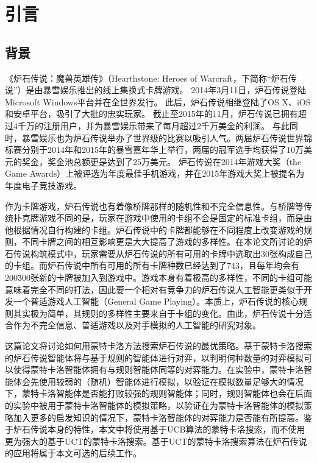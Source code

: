 \section{引言}
\label{section:Introduction}
\subsection{背景}
\label{section:Background}

《炉石传说：魔兽英雄传》（Hearthstone: Heroes of Warcraft，下简称“炉石传说”）是由暴雪娱乐推出的线上集换式卡牌游戏。
2014年3月11日，炉石传说登陆Microsoft Windows平台并在全世界发行。
此后，炉石传说相继登陆了OS X、iOS和安卓平台，吸引了大批的忠实玩家。
截止至2015年的11月，炉石传说已拥有超过4千万的注册用户，并为暴雪娱乐带来了每月超过2千万美金的利润\cite{HearthstonePlayerCount}。
与此同时，暴雪娱乐也为炉石传说举办了世界级的比赛以吸引人气。两届炉石传说世界锦标赛分别于2014年和2015年的暴雪嘉年华上举行，两届的冠军选手均获得了10万美元的奖金，奖金池总额更是达到了25万美元\cite{WorldChampionship2015}。
炉石传说在2014年游戏大奖（the Game Awards）上被评选为年度最佳手机游戏\cite{HearthstoneGameAwards2014}，并在2015年游戏大奖上被提名为年度电子竞技游戏\cite{HearthstoneGameAwards2015}。

作为卡牌游戏，炉石传说也有着像桥牌那样的随机性和不完全信息性。与桥牌等传统扑克牌游戏不同的是，玩家在游戏中使用的卡组不会是固定的标准卡组，而是由他根据情况自行构建的卡组。炉石传说中的卡牌都能够在不同程度上改变游戏的规则，不同卡牌之间的相互影响更是大大提高了游戏的多样性。在本论文所讨论的炉石传说构筑模式中，玩家需要从炉石传说的所有可用的卡牌中选取出30张构成自己的卡组。而炉石传说中所有可用的所有卡牌种数已经达到了743，且每年均会有200\~300张新的卡牌被加入到游戏中。游戏本身有着极高的多样性，不同的卡组可能意味着完全不同的打法，因此要一个相对有竞争力的炉石传说人工智能更类似于开发一个普适游戏人工智能（General Game Playing）\cite{cadiaplayer}。本质上，炉石传说的核心规则其实极为简单，其规则的多样性主要来自于卡组的变化。由此，炉石传说十分适合作为不完全信息、普适游戏以及对手模拟的人工智能的研究对象。

这篇论文将讨论如何用蒙特卡洛方法搜索炉石传说的最优策略。基于蒙特卡洛搜索的炉石传说智能体将与基于规则的智能体进行对弈，以判明何种数量的对弈模拟可以使得蒙特卡洛智能体拥有与规则智能体同等的对弈能力。在实验中，蒙特卡洛智能体会先使用较弱的（随机）智能体进行模拟，以验证在模拟数量足够大的情况下，蒙特卡洛智能体是否能打败较强的规则智能体；同时，规则智能体也会在后面的实验中被用于蒙特卡洛智能体的模拟策略，以验证在为蒙特卡洛智能体的模拟策略加入更多的启发知识的情况下，蒙特卡洛智能体的对弈能力是否能有所提高。鉴于炉石传说本身的特性，本文中将使用基于UCB算法的蒙特卡洛搜索，而不使用更为强大的基于UCT的蒙特卡洛搜索。基于UCT的蒙特卡洛搜索算法在炉石传说的应用将属于本文可选的后续工作。

